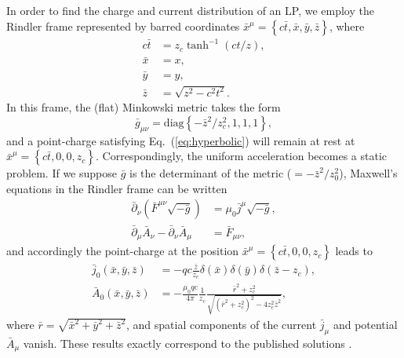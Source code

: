 \documentclass[a4paper,fleqn]{cas-sc}
\begin{document}
In order to find the charge and current distribution of an LP, we employ the Rindler frame \cite{Eriksen2004} represented by barred coordinates $\bar{x}^{\mu} = \left\{c\bar{t},\bar{x},\bar{y},\bar{z}\right\}$, where
\begin{equation}
\begin{aligned}
c\bar{t} &= z_{c} \tanh^{-1}\left(ct/z\right) , \\
\bar{x} &= x ,\\
\bar{y} &= y ,\\
\bar{z} &= \sqrt{z^{2} - c^{2}t^{2}} .%
\end{aligned}
\end{equation}
In this frame, the (flat) Minkowski metric takes the form
\begin{equation}
\bar{g}_{\mu\nu} = \mathrm{diag}\left\{-\bar{z}^{2}/z_{c}^{2},1,1,1\right\} ,
\end{equation}
and a point-charge satisfying Eq.~(\ref{eq:hyperbolic}) will remain at rest at $\bar{x}^{\mu} = \left\{c\bar{t},0,0,z_{c}\right\}$. Correspondingly, the uniform acceleration becomes a static problem. If we suppose $\bar{g}$ is the determinant of the metric ($=-\bar{z}^{2}/z_{0}^{2}$), Maxwell's equations in the Rindler frame can be written
\begin{equation}
\begin{aligned}
\bar{\partial}_{\nu} \left(\bar{F}^{\mu\nu} \sqrt{-\bar{g}}\right) &= \mu_{0}\bar{j}^{\mu} \sqrt{-\bar{g}} , \\
\bar{\partial}_{\mu}\bar{A}_{\nu} - \bar{\partial}_{\nu}\bar{A}_{\mu} &= \bar{F}_{\mu\nu} ,
\end{aligned} \label{eq:Maxwell}
\end{equation}
and accordingly the point-charge at the position $\bar{x}^{\mu} = \left\{c\bar{t},0,0,z_{c}\right\}$ leads to
\begin{align}
\bar{j}_{0}\left(\bar{x},\bar{y},\bar{z}\right) &= -qc \displaystyle\frac{\bar{z}}{z_{c}} \delta\left(\bar{x}\right) \delta\left(\bar{y}\right) \delta\left(\bar{z}-z_{c}\right) , \\
\bar{A}_{0}\left(\bar{x},\bar{y},\bar{z}\right) &= -\displaystyle\frac{\mu_{0}qc}{4\pi} \displaystyle\frac{1}{z_{c}} \displaystyle\frac{\bar{r}^{2} + z_{c}^{2}}{\sqrt{\left(\bar{r}^{2} + z_{c}^{2}\right)^{2} - 4z_{c}^{2}\bar{z}^{2}}} , \label{eq:pointA}
\end{align}
where $\bar{r} = \sqrt{\bar{x}^{2} + \bar{y}^{2} + \bar{z}^{2}}$, and spatial components of the current $\bar{j}_{\mu}$ and potential $\bar{A}_{\mu}$ vanish. These results exactly correspond to the published solutions \cite{Fulton1960,Eriksen2004}.
\end{document}
